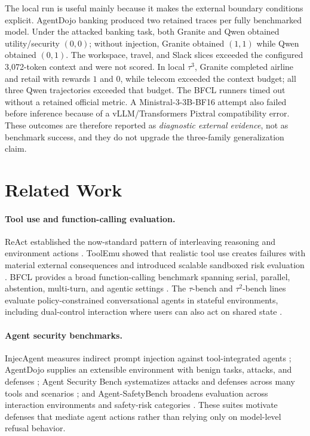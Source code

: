 The local run is useful mainly because it makes the external boundary conditions explicit. AgentDojo banking produced two retained traces per fully benchmarked model. Under the attacked banking task, both Granite and Qwen obtained utility/security $(0,0)$; without injection, Granite obtained $(1,1)$ while Qwen obtained $(0,1)$. The workspace, travel, and Slack slices exceeded the configured 3,072-token context and were not scored. In local $\tau^3$, Granite completed airline and retail with rewards $1$ and $0$, while telecom exceeded the context budget; all three Qwen trajectories exceeded that budget. The BFCL runners timed out without a retained official metric. A Ministral-3-3B-BF16 attempt also failed before inference because of a vLLM/Transformers Pixtral compatibility error. These outcomes are therefore reported as \emph{diagnostic external evidence}, not as benchmark success, and they do not upgrade the three-family generalization claim.


\section{Related Work}
\paragraph{Tool use and function-calling evaluation.}
ReAct established the now-standard pattern of interleaving reasoning and environment actions \cite{react2023}. ToolEmu showed that realistic tool use creates failures with material external consequences and introduced scalable sandboxed risk evaluation \cite{toolemu2024}. BFCL provides a broad function-calling benchmark spanning serial, parallel, abstention, multi-turn, and agentic settings \cite{bfcl2025}. The $\tau$-bench and $\tau^2$-bench lines evaluate policy-constrained conversational agents in stateful environments, including dual-control interaction where users can also act on shared state \cite{taubench2024,tau2bench2025}.

\paragraph{Agent security benchmarks.}
InjecAgent measures indirect prompt injection against tool-integrated agents \cite{injecagent2024}; AgentDojo supplies an extensible environment with benign tasks, attacks, and defenses \cite{agentdojo2024}; Agent Security Bench systematizes attacks and defenses across many tools and scenarios \cite{asb2025}; and Agent-SafetyBench broadens evaluation across interaction environments and safety-risk categories \cite{agentsafetybench2024}. These suites motivate defenses that mediate agent actions rather than relying only on model-level refusal behavior.

